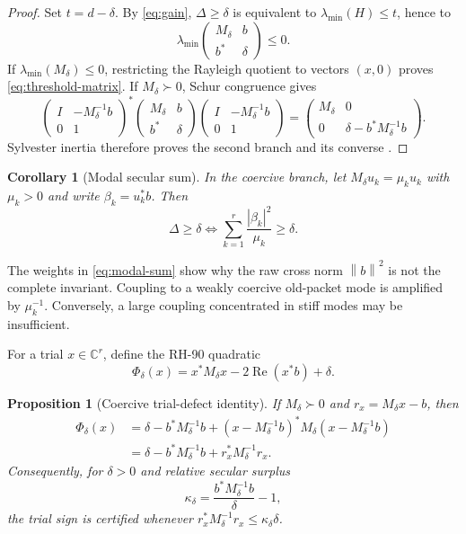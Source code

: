 \documentclass[11pt]{article}
\newtheorem{proposition}[theorem]{Proposition}
\newtheorem{corollary}[theorem]{Corollary}
\theoremstyle{definition}
\theoremstyle{remark}
\newcommand{\norm}[1]{\left\lVert#1\right\rVert}
\begin{document}
\begin{proof}
Set $t=d-\delta$.  By \eqref{eq:gain},
$\Delta\ge\delta$ is equivalent to
$\lambda_{\min}(H)\le t$, hence to
\[
 \lambda_{\min}
 \begin{pmatrix}M_\delta&b\\b^*&\delta\end{pmatrix}
 \le0.
 \label{eq:threshold-matrix}
\]
If $\lambda_{\min}(M_\delta)\le0$, restricting the Rayleigh quotient to
vectors $(x,0)$ proves \eqref{eq:threshold-matrix}.  If
$M_\delta\succ0$, Schur congruence gives
\[
 \begin{pmatrix}I&-M_\delta^{-1}b\\0&1\end{pmatrix}^{\!*}
 \begin{pmatrix}M_\delta&b\\b^*&\delta\end{pmatrix}
 \begin{pmatrix}I&-M_\delta^{-1}b\\0&1\end{pmatrix}
 =
 \begin{pmatrix}
 M_\delta&0\\0&\delta-b^*M_\delta^{-1}b
 \end{pmatrix}.
\]
Sylvester inertia therefore proves the second branch and its converse
\citep{HornJohnson2013,Bhatia1997}.
\end{proof}

\begin{corollary}[Modal secular sum]
\label{cor:modal}
In the coercive branch, let
$M_\delta u_k=\mu_k u_k$ with $\mu_k>0$ and write
$\beta_k=u_k^*b$.  Then
\begin{equation}
 \Delta\ge\delta
 \iff
 \sum_{k=1}^r\frac{|\beta_k|^2}{\mu_k}\ge\delta.
 \label{eq:modal-sum}
\end{equation}
\end{corollary}

The weights in \eqref{eq:modal-sum} show why the raw cross norm
$\norm b^2$ is not the complete invariant.  Coupling to a weakly coercive
old-packet mode is amplified by $\mu_k^{-1}$.  Conversely, a large coupling
concentrated in stiff modes may be insufficient.

For a trial $x\in\mathbb C^r$, define the RH-90 quadratic
\begin{equation}
 \Phi_\delta(x)=x^*M_\delta x-2\operatorname{Re}(x^*b)+\delta.
 \label{eq:phi}
\end{equation}

\begin{proposition}[Coercive trial-defect identity]
\label{prop:defect}
If $M_\delta\succ0$ and $r_x=M_\delta x-b$, then
\begin{align}
 \Phi_\delta(x)
 &=\delta-b^*M_\delta^{-1}b
 +(x-M_\delta^{-1}b)^*M_\delta(x-M_\delta^{-1}b)
 \label{eq:complete-square}\\
 &=\delta-b^*M_\delta^{-1}b+r_x^*M_\delta^{-1}r_x.
 \label{eq:residual-defect}
\end{align}
Consequently, for $\delta>0$ and relative secular surplus
\[
 \kappa_\delta=\frac{b^*M_\delta^{-1}b}{\delta}-1,
\]
the trial sign is certified whenever
$r_x^*M_\delta^{-1}r_x\le\kappa_\delta\delta$.
\end{proposition}
\end{document}

